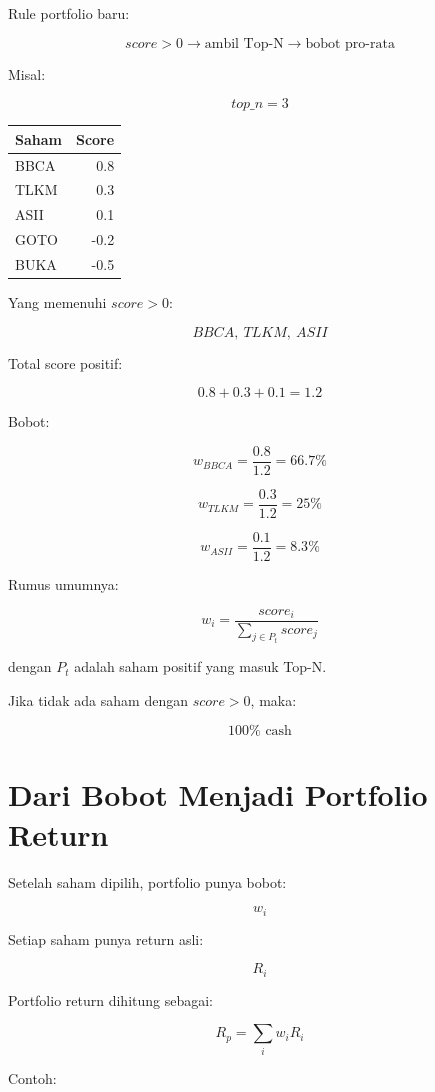 \documentclass[11pt,a4paper]{article}
\begin{document}
Rule portfolio baru:

\[
\boxed{
score > 0
\rightarrow
\text{ambil Top-N}
\rightarrow
\text{bobot pro-rata}
}
\]

Misal:

\[
top\_n = 3
\]

\begin{center}
\begin{tabular}{lr}
\toprule
Saham & Score \\
\midrule
BBCA & 0.8 \\
TLKM & 0.3 \\
ASII & 0.1 \\
GOTO & -0.2 \\
BUKA & -0.5 \\
\bottomrule
\end{tabular}
\end{center}

Yang memenuhi \(score > 0\):

\[
BBCA,\ TLKM,\ ASII
\]

Total score positif:

\[
0.8 + 0.3 + 0.1 = 1.2
\]

Bobot:

\[
w_{BBCA} = \frac{0.8}{1.2}=66.7\%
\]

\[
w_{TLKM} = \frac{0.3}{1.2}=25\%
\]

\[
w_{ASII} = \frac{0.1}{1.2}=8.3\%
\]

Rumus umumnya:

\[
\boxed{
w_i =
\frac{score_i}
{\sum_{j \in P_t} score_j}
}
\]

dengan \(P_t\) adalah saham positif yang masuk Top-N.

Jika tidak ada saham dengan \(score > 0\), maka:

\[
\boxed{
100\% \text{ cash}
}
\]

\section{Dari Bobot Menjadi Portfolio Return}

Setelah saham dipilih, portfolio punya bobot:

\[
w_i
\]

Setiap saham punya return asli:

\[
R_i
\]

Portfolio return dihitung sebagai:

\[
\boxed{
R_p = \sum_i w_i R_i
}
\]

Contoh:
\end{document}
